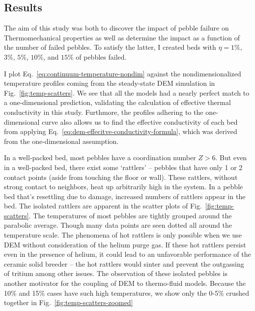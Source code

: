 \subsection{Results}
The aim of this study was both to discover the impact of pebble failure on Thermomechanical properties as well as determine the impact as a function of the number of failed pebbles. To satisfy the latter, I created beds with $\eta = 1\%$, $3\%$, $5\%$, $10\%$, and $15\%$ of pebbles failed. 

I plot Eq.~\ref{eq:continuum-temperature-nondim} against the nondimensionalized temperature profiles coming from the steady-state DEM simulation in Fig.~\ref{fig:temp-scatters}. We see that all the models had a nearly perfect match to a one-dimensional prediction, validating the calculation of effective thermal conductivity in this study. Furthmore, the profiles adhering to the one-dimensional curve also allows us to find the effective conductivity of each bed from applying Eq.~\ref{eq:dem-effecitve-conductivity-formula}, which was derived from the one-dimensional assumption.

In a well-packed bed, most pebbles have a coordination number $Z > 6$. But even in a well-packed bed, there exist some `rattlers' -- pebbles that have only 1 or 2 contact points (aside from touching the floor or wall). These rattlers, without strong contact to neighbors, heat up arbitrarily high in the system. In a pebble bed that's resettling due to damage, increased numbers of rattlers appear in the bed. The isolated rattlers are apparent in the scatter plots of Fig.~\ref{fig:temp-scatters}. The temperatures of most pebbles are tightly grouped around the parabolic average. Though many data points are seen dotted all around the temperature scale. The phenomena of hot rattlers is only possible when we use DEM without consideration of the helium purge gas. If these hot rattlers persist even in the presence of helium, it could lead to an unfavorable performance of the ceramic solid breeder -- the hot rattlers would sinter and prevent the outgassing of tritium among other issues. The observation of these isolated pebbles is another motivator for the coupling of DEM to thermo-fluid models. Because the 10\% and 15\% cases have such high temperatures, we show only the 0-5\% crushed together in Fig.~\ref{fig:temp-scatters-zoomed}

